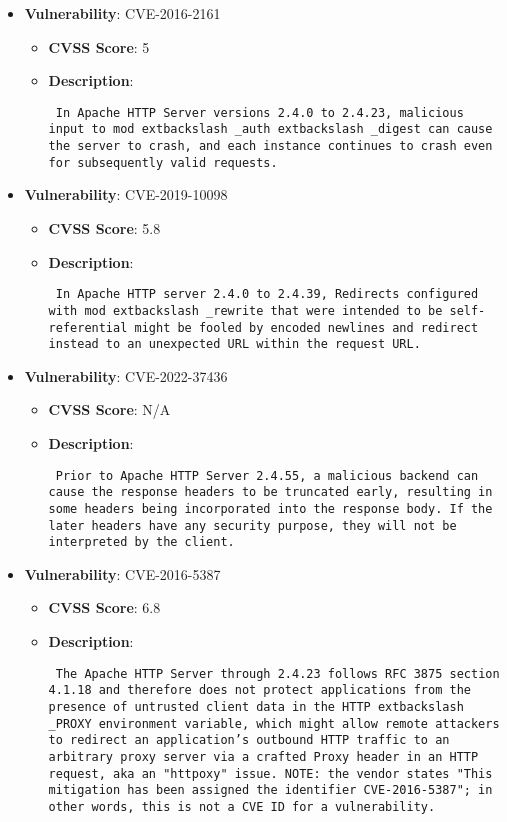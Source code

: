 \documentclass{article}
\begin{document}
\begin{itemize}
        \item \textbf{Vulnerability}: CVE-2016-2161
        \begin{itemize}
            \item \textbf{CVSS Score}:  5 
            \item \textbf{Description}: \parbox{\linewidth}{\texttt{ In Apache HTTP Server versions 2.4.0 to 2.4.23, malicious input to mod	extbackslash _auth	extbackslash _digest can cause the server to crash, and each instance continues to crash even for subsequently valid requests. }}
        \end{itemize}
    
        \item \textbf{Vulnerability}: CVE-2019-10098
        \begin{itemize}
            \item \textbf{CVSS Score}:  5.8 
            \item \textbf{Description}: \parbox{\linewidth}{\texttt{ In Apache HTTP server 2.4.0 to 2.4.39, Redirects configured with mod	extbackslash _rewrite that were intended to be self-referential might be fooled by encoded newlines and redirect instead to an unexpected URL within the request URL. }}
        \end{itemize}
    
        \item \textbf{Vulnerability}: CVE-2022-37436
        \begin{itemize}
            \item \textbf{CVSS Score}:  N/A 
            \item \textbf{Description}: \parbox{\linewidth}{\texttt{ Prior to Apache HTTP Server 2.4.55, a malicious backend can cause the response headers to be truncated early, resulting in some headers being incorporated into the response body. If the later headers have any security purpose, they will not be interpreted by the client. }}
        \end{itemize}
    
        \item \textbf{Vulnerability}: CVE-2016-5387
        \begin{itemize}
            \item \textbf{CVSS Score}:  6.8 
            \item \textbf{Description}: \parbox{\linewidth}{\texttt{ The Apache HTTP Server through 2.4.23 follows RFC 3875 section 4.1.18 and therefore does not protect applications from the presence of untrusted client data in the HTTP	extbackslash _PROXY environment variable, which might allow remote attackers to redirect an application's outbound HTTP traffic to an arbitrary proxy server via a crafted Proxy header in an HTTP request, aka an "httpoxy" issue.  NOTE: the vendor states "This mitigation has been assigned the identifier CVE-2016-5387"; in other words, this is not a CVE ID for a vulnerability. }}
        \end{itemize}
    

\end{itemize}
\end{document}
